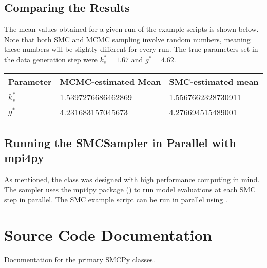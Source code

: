 \documentclass[letterpaper,10pt,english]{sphinxmanual}
\begin{document}
\begin{figure}[htbp]
\centering

\noindent{}
\end{figure}


\section{Comparing the Results}
\label{\detokenize{example:comparing-the-results}}
The mean values obtained for a given run of the example scripts is shown below.
Note that both SMC and MCMC sampling involve random numbers, meaning these
numbers will be slightly different for every run. The true parameters set in the data generation step were \(k_s^* = 1.67\) and \(g^* = 4.62\).


\begin{savenotes}\sphinxattablestart
\centering
\begin{tabulary}{\linewidth}[t]{|T|T|T|}
\hline
\sphinxstyletheadfamily 
Parameter
&\sphinxstyletheadfamily 
MCMC-estimated Mean
&\sphinxstyletheadfamily 
SMC-estimated mean
\\
\hline
\(k_s^*\)
&
1.5397276686462869
&
1.5567662328730911
\\
\hline
\(g^*\)
&
4.231683157045673
&
4.276694515489001
\\
\hline
\end{tabulary}
\par
\sphinxattableend\end{savenotes}


\section{Running the SMCSampler in Parallel with mpi4py}
\label{\detokenize{example:running-the-smcsampler-in-parallel-with-mpi4py}}
As mentioned, the  class was designed with high performance computing in mind. The sampler uses the mpi4py package () to run model evaluations at each SMC step in parallel. The SMC example script can be run in parallel using .


\chapter{Source Code Documentation}
\label{\detokenize{source_code:source-code-documentation}}\label{\detokenize{source_code:sourceode-section}}\label{\detokenize{source_code::doc}}
Documentation for the primary SMCPy classes.
\end{document}
